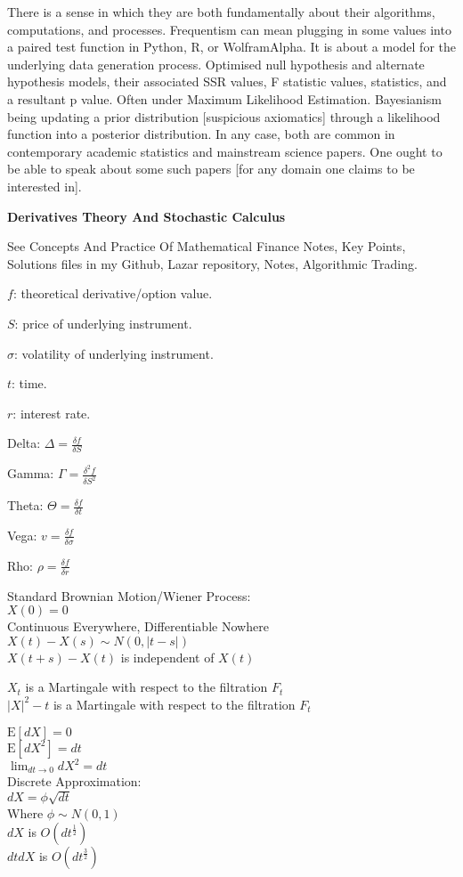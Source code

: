 There is a sense in which they are both fundamentally about their algorithms, computations, and processes. Frequentism can mean plugging in some values into a paired test function in Python, R, or WolframAlpha. It is about a model for the underlying data generation process. Optimised null hypothesis and alternate hypothesis models, their associated SSR values, F statistic values, statistics, and a resultant p value. Often under Maximum Likelihood Estimation. Bayesianism being updating a prior distribution [suspicious axiomatics] through a likelihood function into a posterior distribution. In any case, both are common in contemporary academic statistics and mainstream science papers. One ought to be able to speak about some such papers [for any domain one claims to be interested in].

\newpage

\textbf{Derivatives Theory And Stochastic Calculus}

See Concepts And Practice Of Mathematical Finance Notes, Key Points, Solutions files in my Github, Lazar repository, Notes, Algorithmic Trading.

$f$: theoretical derivative/option value.

$S$: price of underlying instrument.

$\sigma$: volatility of underlying instrument.

$t$: time.

$r$: interest rate.

Delta: $\Delta = \frac{\delta f}{\delta S}$

Gamma: $\Gamma = \frac{\delta^2 f}{\delta S^2}$

Theta: $\Theta = \frac{\delta f}{\delta t}$

Vega: $v = \frac{\delta f}{\delta \sigma}$

Rho: $\rho = \frac{\delta f}{\delta r}$

Standard Brownian Motion/Wiener Process: \\
$X(0)=0$ \\
Continuous Everywhere, Differentiable Nowhere \\
$X(t)-X(s) \sim N(0,|t-s|)$ \\
$X(t+s)-X(t)$ is independent of $X(t)$

$X_t$ is a Martingale with respect to the filtration $F_t$ \\
$|X|^2-t$ is a Martingale with respect to the filtration $F_t$

$\text{E}[dX]=0$ \\
$\text{E}[dX^2]=dt$ \\
$\lim_{dt \to 0}dX^2=dt$ \\
Discrete Approximation: \\
$dX=\phi \sqrt{dt}$ \\
Where $\phi \sim N(0,1)$ \\
$dX$ is $O(dt^{\frac{1}{2}})$ \\
$dtdX$ is $O(dt^{\frac{3}{2}})$


